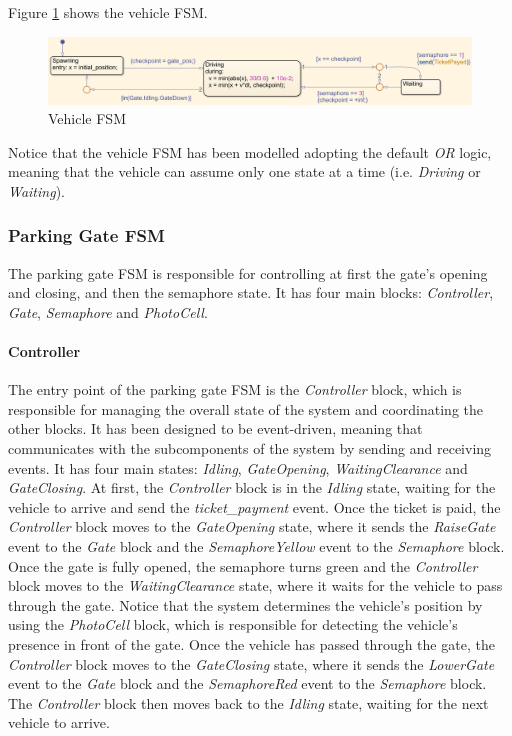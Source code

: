 Figure \ref{fig:vehicle_fsm} shows the vehicle FSM.

\begin{figure}[H]
    \centering
    \includegraphics[width=1.0\textwidth]{./img/MATLAB/vehicle_fsm.png}
    \caption{Vehicle FSM}
    \label{fig:vehicle_fsm}
\end{figure}

Notice that the vehicle FSM has been modelled adopting the default \textit{OR} logic, meaning that the vehicle can assume only one state at a time (i.e. \textit{Driving} or \textit{Waiting}).



\subsubsection{Parking Gate FSM}
\label{subsubsec:parking_gate_fsm}

The parking gate FSM is responsible for controlling at first the gate's opening and closing, and then the semaphore state.
It has four main blocks: \textit{Controller}, \textit{Gate}, \textit{Semaphore} and \textit{PhotoCell}.


\paragraph{Controller}

The entry point of the parking gate FSM is the \textit{Controller} block, which is responsible for managing the overall state of the system and coordinating the other blocks.
It has been designed to be event-driven, meaning that communicates with the subcomponents of the system by sending and receiving events.
It has four main states: \textit{Idling}, \textit{GateOpening}, \textit{WaitingClearance} and \textit{GateClosing}.
At first, the \textit{Controller} block is in the \textit{Idling} state, waiting for the vehicle to arrive and send the \textit{ticket\_payment} event.
Once the ticket is paid, the \textit{Controller} block moves to the \textit{GateOpening} state, where it sends the \textit{RaiseGate} event to the \textit{Gate} block and the \textit{SemaphoreYellow} event to the \textit{Semaphore} block.
Once the gate is fully opened, the semaphore turns green and the \textit{Controller} block moves to the \textit{WaitingClearance} state, where it waits for the vehicle to pass through the gate.
Notice that the system determines the vehicle's position by using the \textit{PhotoCell} block, which is responsible for detecting the vehicle's presence in front of the gate.
Once the vehicle has passed through the gate, the \textit{Controller} block moves to the \textit{GateClosing} state, where it sends the \textit{LowerGate} event to the \textit{Gate} block and the \textit{SemaphoreRed} event to the \textit{Semaphore} block.
The \textit{Controller} block then moves back to the \textit{Idling} state, waiting for the next vehicle to arrive.

